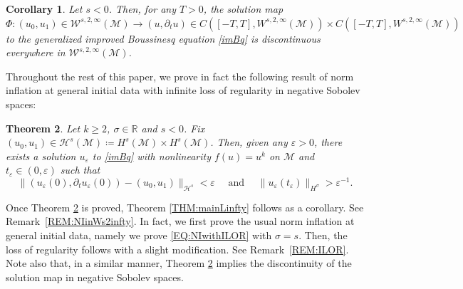 \documentclass[letterpaper, 11pt,  reqno]{amsart}
\newtheorem{theorem}{Theorem} [section]
\newtheorem{corollary}[theorem]{Corollary}
\newcommand{\1}{\hspace{0.5mm}\text{I}\hspace{0.5mm}}
\newcommand{\R}{\mathbb{R}}
\newcommand{\M}{\mathcal{M}}
\renewcommand{\H}{\mathcal{H}}
\newcommand{\eps}{\varepsilon}
\newcommand{\s}{\sigma}
\newcommand{\dt}{\partial_t}
\newcommand{\W}{\mathcal{W}}
\numberwithin{equation}{section}
\numberwithin{theorem}{section}
\begin{document}
\begin{corollary}
\label{COR:DiscSolMap}
Let $s<0$. Then, for any $T > 0$, the solution map $\Phi \colon (u_0, u_1) \in \W^{s, 2, \infty}(\M) \to (u, \dt u) \in C([-T, T], W^{s, 2, \infty}(\M)) \times C([-T, T], W^{s, 2, \infty} (\M)) $ to the generalized improved Boussinesq equation \eqref{imBq} is discontinuous everywhere in $\W^{s, 2, \infty} (\M)$. 

\end{corollary}
















Throughout the rest of this paper, we prove in fact the following result of norm inflation at general initial data with infinite loss of regularity in negative Sobolev spaces:

\begin{theorem}
\label{THM:main}
Let $k \geq 2$, $\s \in \R$ and $s < 0$. Fix $(u_0 , u_1) \in \H^s (\M) \coloneqq H^s (\M) \times H^s (\M)$. Then, given any $\eps > 0$, there exists a solution $u_\eps$ to \eqref{imBq} with nonlinearity $f(u) = u^k$ on $\M$ and $t_\eps \in (0, \eps)$ such that
\begin{equation}
\label{EQ:NIwithILOR}
\| (u_\eps (0), \dt u_\eps (0)) - (u_0 , u_1) \|_{\H^s} < \eps \quad \text{ and } \quad \| u_\eps (t_\eps) \|_{H^\s} > \eps^{-1}.
\end{equation}
\end{theorem}

Once Theorem \ref{THM:main} is proved, Theorem \ref{THM:mainLinfty} follows as a corollary. See Remark~\ref{REM:NIinWs2infty}. In fact, we first prove the usual norm inflation at general initial data, namely we prove \eqref{EQ:NIwithILOR} with $\s = s$. Then, the loss of regularity follows with a slight modification. See Remark~\ref{REM:ILOR}. Note also that, in a similar manner, Theorem \ref{THM:main} implies the discontinuity of the solution map in negative Sobolev spaces.


\end{document}
